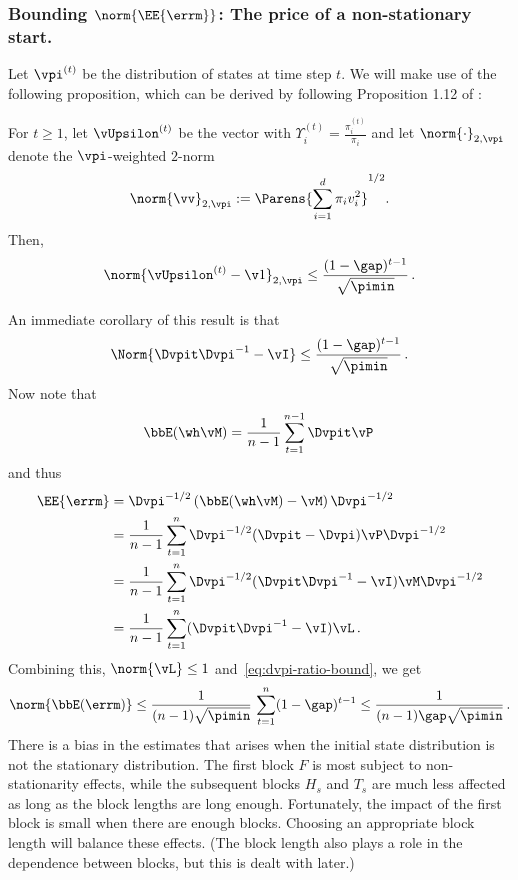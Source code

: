 \subsubsection{Bounding $\norm{\EE{\errm}}$: The price of a non-stationary start.}
Let $\vpi^{(t)}$ be the distribution of states at time step $t$.
We will make use of the following proposition, which can be derived by following 
Proposition 1.12 of \citet{MoTe06}:
\begin{proposition}
For $t\ge 1$, let $\vUpsilon^{(t)}$ be the vector with $\Upsilon^{(t)}_i= \frac{\pi_i^{(t)}}{\pi_i}$ and let
$\norm{\cdot}_{2,\vpi}$ denote the $\vpi$-weighted $2$-norm
\begin{align}
\label{eq:vv}
  \norm{\vv}_{2,\vpi} := \Parens{ \sum_{i=1}^d \pi_i v_i^2 }^{1/2}
  .
\end{align}
 Then,
\begin{equation}
  \label{eq:L2-contraction}
  \norm{ \vUpsilon^{(t)} - \v1 }_{2,\vpi} \leq
  \frac{(1-\gap)^{t-1}}{\sqrt{\pimin}} \,.
\end{equation}
\end{proposition}
An immediate corollary of this result is that 
\begin{align}
\label{eq:dvpi-ratio-bound}
\Norm{  \Dvpit \Dvpi^{-1} - \vI  } \le \frac{(1-\gap)^{t-1}}{\sqrt{\pimin}}\,.
\end{align}
Now note that
\begin{align*}
\bbE (\wh\vM) = \frac{1}{n-1} \sum_{t=1}^{n-1} \Dvpit \vP\,
\end{align*}
and thus
\begin{align*}
\EE{\errm} &=
  \Dvpi^{-1/2}
  \left(\bbE( \wh\vM )- \vM\right)
  \Dvpi^{-1/2}\\
& =  
\frac{1}{n-1} \sum_{t=1}^n
  \Dvpi^{-1/2} (\Dvpit  - \Dvpi) \vP \Dvpi^{-1/2} \\
& =  
\frac{1}{n-1} \sum_{t=1}^n
  \Dvpi^{-1/2} (\Dvpit \Dvpi^{-1} - \vI) \vM \Dvpi^{-1/2} \\
& =  
\frac{1}{n-1} \sum_{t=1}^n
   (\Dvpit \Dvpi^{-1} - \vI) \vL \,.
\end{align*}
Combining this, $\norm{\vL}\le 1$ and~\eqref{eq:dvpi-ratio-bound}, we get
\begin{align}
\label{eq:biasbound}
\norm{\bbE(\errm)} \le \frac{1}{(n-1)\sqrt{\pimin}}\, \sum_{t=1}^n (1-\gap)^{t-1} \le  \frac{1}{(n-1)\gap\sqrt{\pimin}}\, .
\end{align}
There is a bias in the estimates that arises when the initial state
distribution is not the stationary distribution.
The first block $F$ is most subject to non-stationarity effects, while
the subsequent blocks $H_s$ and $T_s$ are much less affected as long
as the block lengths are long enough.
Fortunately, the impact of the first block is small when there are
enough blocks.
Choosing an appropriate block length will balance these effects.
(The block length also plays a role in the dependence between blocks,
but this is dealt with later.)

